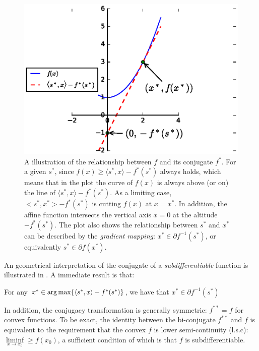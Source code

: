 \begin{figure}[h!]
  \centering
  \includegraphics[width=0.7\linewidth, trim={0 0 3cm 1.5cm},
                    clip]{figures/conjugate-function.eps}

  \caption{A illustration of the relationship between $f$ and its conjugate
    $f^*$. For a given $s^*$, since $f(x) \geq \langle s^*, x \rangle  -
    f^*(s^*)$ always holds, which means that in the plot the curve of $f(x)$ is
    always above (or on) the line of $\langle s^*, x \rangle  - f^*(s^*)$. As a
    limiting case, $<s^*, x^*> - f^*(s^*)$ is cutting $f(x)$ at $x = x^*$. In
    addition, the affine function intersects the vertical axis $x = 0$ at the
    altitude $-f^*(s^*)$. The plot also shows the relationship between $s^*$ and
    $x^*$ can be described by the \emph{gradient mapping}: $x^* \in \partial
    f^{-1}(s^*)$, or equivalently $s^* \in \partial f(x^*)$.}

  \label{fig::conjugate-function}
\end{figure}

An geometrical interpretation of the conjugate of a \emph{subdifferentiable}
function is illustrated in . A immediate
result is that:

\begin{thm} \label{thm::conjugate-attainer}
For any $x^* \in \operatorname*{arg\,max} \{ \langle s^*, x \rangle  - f^*(s^*)
\}$, we have that $x^* \in \partial f^{-1}(s^*)$
\end{thm}

In addition, the conjugacy transformation is generally symmetric: $f^{**} = f$
for convex functions. To be exact, the identity between the bi-conjugate
$f^{**}$ and $f$ is equivalent to the requirement that the convex $f$ is lower
semi-continuity (l.s.c): $\liminf\limits_{x \rightarrow x_0} \geq f(x_0)$, a
sufficient condition of which is that $f$ is subdifferentiable.


